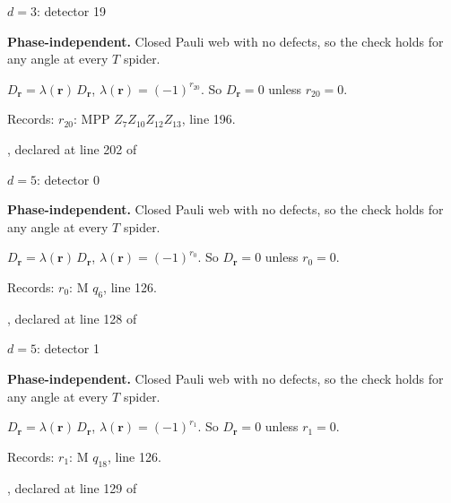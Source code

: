 \label{d3_det019}
{\Large $d=3$: detector 19}\par
\textbf{Phase-independent.} Closed Pauli web with no defects, so the check holds for any angle at every $T$ spider.
\begin{center}
\end{center}
\vspace{-1mm}
$D_{\boldsymbol r}=\lambda(\boldsymbol r)\,D_{\boldsymbol r}$, \quad $\lambda(\boldsymbol r)=(-1)^{r_{20}}$. \qquad So $D_{\boldsymbol r}=0$ unless $r_{20}=0$.
\par\smallskip\begin{minipage}{.98\linewidth}\small Records: $r_{20}$: MPP $Z_{7}Z_{10}Z_{12}Z_{13}$, line 196.\end{minipage}
\vfill
{\footnotesize\texttt{}, declared at line 202 of \texttt{}}
\newpage

\label{d5_det000}
{\Large $d=5$: detector 0}\par
\textbf{Phase-independent.} Closed Pauli web with no defects, so the check holds for any angle at every $T$ spider.
\begin{center}
\end{center}
\vspace{-1mm}
$D_{\boldsymbol r}=\lambda(\boldsymbol r)\,D_{\boldsymbol r}$, \quad $\lambda(\boldsymbol r)=(-1)^{r_{0}}$. \qquad So $D_{\boldsymbol r}=0$ unless $r_{0}=0$.
\par\smallskip\begin{minipage}{.98\linewidth}\small Records: $r_{0}$: M $q_{6}$, line 126.\end{minipage}
\vfill
{\footnotesize\texttt{}, declared at line 128 of \texttt{}}
\newpage

\label{d5_det001}
{\Large $d=5$: detector 1}\par
\textbf{Phase-independent.} Closed Pauli web with no defects, so the check holds for any angle at every $T$ spider.
\begin{center}
\end{center}
\vspace{-1mm}
$D_{\boldsymbol r}=\lambda(\boldsymbol r)\,D_{\boldsymbol r}$, \quad $\lambda(\boldsymbol r)=(-1)^{r_{1}}$. \qquad So $D_{\boldsymbol r}=0$ unless $r_{1}=0$.
\par\smallskip\begin{minipage}{.98\linewidth}\small Records: $r_{1}$: M $q_{18}$, line 126.\end{minipage}
\vfill
{\footnotesize\texttt{}, declared at line 129 of \texttt{}}
\newpage

